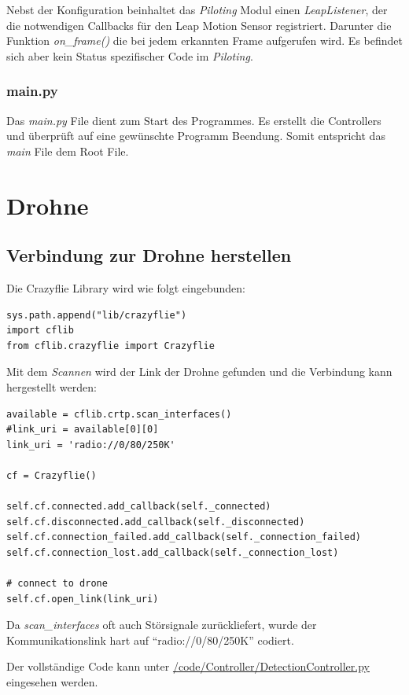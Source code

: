 Nebst der Konfiguration beinhaltet das \textit{Piloting} Modul einen \textit{LeapListener}, der die notwendigen Callbacks für den Leap Motion Sensor registriert. Darunter die Funktion \textit{on\_frame()} die bei jedem erkannten Frame aufgerufen wird.
Es befindet sich aber kein Status spezifischer Code im \textit{Piloting}.

\subsubsection{main.py}
Das \textit{main.py} File dient zum Start des Programmes. Es erstellt die Controllers und überprüft auf eine gewünschte Programm Beendung. Somit entspricht das \textit{main} File dem Root File.


\section{Drohne}
\subsection{Verbindung zur Drohne herstellen}
Die Crazyflie Library wird wie folgt eingebunden:
\begin{lstlisting}[style=lstStyleCpp]
sys.path.append("lib/crazyflie")
import cflib
from cflib.crazyflie import Crazyflie
\end{lstlisting}

Mit dem \textit{Scannen} wird der Link der Drohne gefunden und die Verbindung kann hergestellt werden:
\begin{lstlisting}[style=lstStyleCpp]
available = cflib.crtp.scan_interfaces()
#link_uri = available[0][0]
link_uri = 'radio://0/80/250K'

cf = Crazyflie()

self.cf.connected.add_callback(self._connected)
self.cf.disconnected.add_callback(self._disconnected)
self.cf.connection_failed.add_callback(self._connection_failed)
self.cf.connection_lost.add_callback(self._connection_lost)

# connect to drone
self.cf.open_link(link_uri)
\end{lstlisting}

Da \textit{scan\_interfaces} oft auch Störsignale zurückliefert, wurde der Kommunikationslink hart auf "`radio://0/80/250K"' codiert.

Der vollständige Code kann unter \href{https://github.com/MrJack91/droneGestures/blob/master/code/Controller/CrazyflieController.py}{/code/Controller/DetectionController.py} eingesehen werden.

